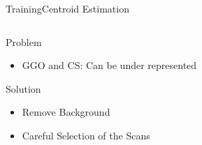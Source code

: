 \documentclass{standalone}
\begin{document}
\begin{frame}{Training}{Centroid Estimation}
\begin{columns}
\begin{column}{.4\textwidth}
\begin{alertblock}{Problem}
\begin{itemize}
							\item GGO and CS: Can be under represented 
						\end{itemize}		
					\end{alertblock}
				
					\begin{exampleblock}{Solution}\setlength\itemsep{1.em}
						\begin{itemize}
							\item Remove Background
							
							\item Careful Selection of the Scans
						\end{itemize}
					\end{exampleblock}
			
			
			\end{column}
			
		\end{columns}
		
		
	\end{frame}
\end{document}
